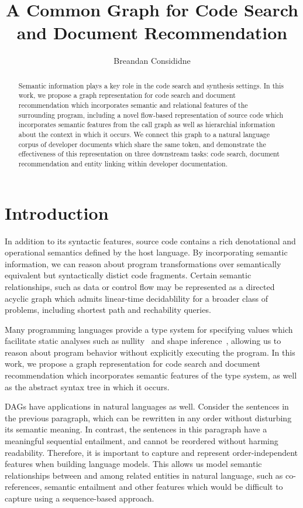 \documentclass{article}
\title{A Common Graph for Code Search and Document Recommendation}
\author{Breandan Consididne}
\begin{document}
    \maketitle

    \begin{abstract}
Semantic information plays a key role in the code search and synthesis settings. In this work, we propose a graph representation for code search and document recommendation which incorporates semantic and relational features of the surrounding program, including a novel flow-based representation of source code which incorporates semantic features from the call graph as well as hierarchial information about the context in which it occurs. We connect this graph to a natural language corpus of developer documents which share the same token, and demonstrate the effectiveness of this representation on three downstream tasks: code search, document recommendation and entity linking within developer documentation.
    \end{abstract}

    \section{Introduction}

In addition to its syntactic features, source code contains a rich denotational and operational semantics defined by the host language. By incorporating semantic information, we can reason about program transformations over semantically equivalent but syntactically distict code fragments. Certain semantic relationships, such as data or control flow may be represented as a directed acyclic graph which admits linear-time decidablility for a broader class of problems, including shortest path and rechability queries.

Many programming languages provide a type system for specifying values which facilitate static analyses such as nullity~\citep{ekman2007pluggable} and shape inference~\citep{considine2019kotlingrad}, allowing us to reason about program behavior without explicitly executing the program. In this work, we propose a graph representation for code search and document recommendation which incorporates semantic features of the type system, as well as the abstract syntax tree in which it occurs.

    DAGs have applications in natural languages as well. Consider the sentences in the previous paragraph, which can be rewritten in any order without disturbing its semantic meaning. In contrast, the sentences in this paragraph have a meaningful sequential entailment, and cannot be reordered without harming readability. Therefore, it is important to capture and represent order-independent features when building language models. This allows us model semantic relationships between and among related entities in natural language, such as co-references, semantic entailment and other features which would be difficult to capture using a sequence-based approach.
\end{document}
